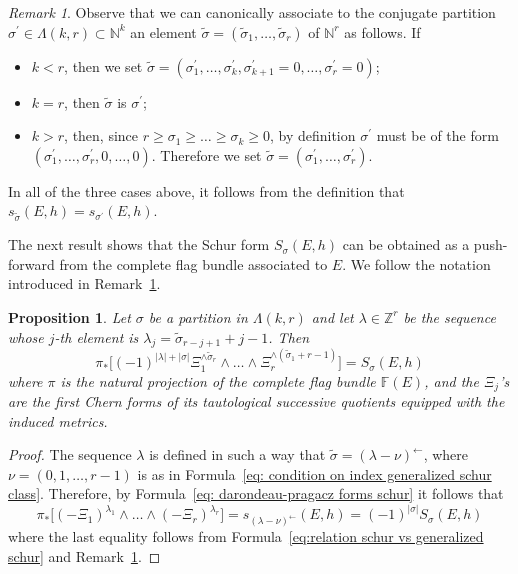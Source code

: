 \documentclass[a4paper]{amsart}
\theoremstyle{plain}%
\newtheorem{proposition}[theorem]{Proposition}
\theoremstyle{definition}
\theoremstyle{remark}
\newtheorem{remark}[theorem]{Remark}
\newcommand{\N}{\mathbb{N}}
\newcommand{\Z}{\mathbb{Z}}
\newcommand{\FF}{\mathbb{F}}
\begin{document}
\begin{remark}\label{rem: change sequences of schur}
	Observe that we can canonically associate to the conjugate partition $ \sigma^{\prime} \in \Lambda(k,r) \subset \N^k $ an element $ \tilde{\sigma} = (\tilde{\sigma}_1,\dots,\tilde{\sigma}_r)$ of $ \N^r $ as follows.
	If
	\begin{itemize}
		\item $ k < r $, then we set $ \tilde{\sigma} = (\sigma_1^{\prime},\dots,\sigma_{k}^{\prime},\sigma_{k + 1}^{\prime}=0,\dots,\sigma_{r}^{\prime}=0) $;
		\item $ k = r $, then $ \tilde{\sigma} $ is $ \sigma^{\prime} $;
		\item $ k > r $, then, since $ r \ge \sigma_1 \ge \dots \ge \sigma_{k} \ge 0 $, by definition $ \sigma^{\prime} $ must be of the form $ (\sigma_1^{\prime},\dots,\sigma_{r}^{\prime},0,\dots,0) $.
		Therefore we set $ \tilde{\sigma} = (\sigma_1^{\prime},\dots,\sigma_{r}^{\prime}) $.
	\end{itemize}
	In all of the three cases above, it follows from the definition that $ s_{\tilde{\sigma}}(E,h) = s_{\sigma^{\prime}}(E,h) $.
\end{remark}
The next result shows that the Schur form $ S_{\sigma}(E,h) $ can be obtained as a push-forward from the complete flag bundle associated to $ E $.
We follow the notation introduced in Remark~\ref{rem: change sequences of schur}.
\begin{proposition}\label{prop: schur forms as push-forwards}
	Let $ \sigma $ be a partition in $ \Lambda(k,r) $ and let $ \lambda \in \Z^{r} $ be the sequence whose $ j $-th element is $ \lambda_j = \tilde{\sigma}_{r-j+1} + j-1 $.
	Then
	\begin{equation*}\label{eq: push to obtain the auxiliary schur form}
		\pi_{*} \big[ (-1)^{|\lambda|+|\sigma|} \Xi_1^{\wedge \tilde{\sigma}_r} \wedge \dots \wedge \Xi_r^{\wedge (\tilde{\sigma}_{1} + r - 1)} \big] = S_{\sigma}(E,h)
	\end{equation*}
	where $ \pi $ is the natural projection of the complete flag bundle $ \FF(E) $, and the $ \Xi_j $'s are the first Chern forms of its tautological successive quotients equipped with the induced metrics.
\end{proposition}
\begin{proof}
	The sequence $ \lambda $ is defined in such a way that $ \tilde{\sigma} = (\lambda - \nu)^{\leftarrow} $, where $ \nu = (0,1,\dots,r-1)$ is as in Formula~\eqref{eq: condition on index generalized schur class}.
	Therefore, by Formula~\eqref{eq: darondeau-pragacz forms schur} it follows that
	\[
	\pi_{*} \bigl[ (-\Xi_1)^{\lambda_1} \wedge \dots \wedge (-\Xi_r)^{\lambda_r} \bigr] = s_{(\lambda - \nu)^{\leftarrow}}(E,h) = (-1)^{|\sigma|} S_{\sigma}(E,h)
	\]
	where the last equality follows from Formula~\eqref{eq:relation schur vs generalized schur} and Remark~\ref{rem: change sequences of schur}.
\end{proof}
\end{document}
